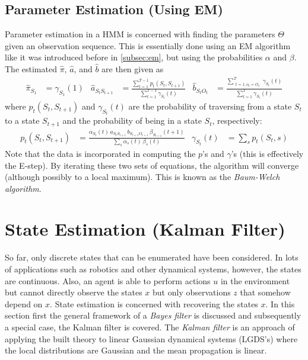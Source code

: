		\subsection{Parameter Estimation (Using EM)}
			Parameter estimation in a HMM is concerned with finding the parameters \(\Theta\) given an observation sequence. This is essentially done using an EM algorithm like it was introduced before in \autoref{subsec:em}, but using the probabilities \(\alpha\) and \(\beta\). The estimated \(\hat{\pi}\), \(\hat{a}\), and \(\hat{b}\) are then given as
			\begin{align}
				\hat{\pi}_{S_1}         & = \gamma_{S_1}(1)                                                                                 &
				\hat{a}_{S_t S_{t + 1}} & = \frac{\sum_{t = 1}^{T - 1} p_t(S_t, S_{t + 1})}{\sum_{t = 1}^{T - 1} \gamma_{S_t}(t)}           &
				\hat{b}_{S_t O_t}       & = \frac{\sum_{\substack{t = 1; o_t = O_t}}^{T} \gamma_{S_t}(t)}{\sum_{t = 1}^{T} \gamma_{S_t}(t)}
			\end{align}
			where \( p_t(S_t, S_{t + 1}) \) and \( \gamma_{S_t}(t) \) are the probability of traversing from a state \(S_t\) to a state \(S_{t + 1}\) and the probability of being in a state \(S_t\), respectively:
			\begin{align}
				p_t(S_t, S_{t + 1}) & = \frac{\alpha_{S_t}(t) \, a_{S_t S_{t + 1}} \, b_{S_{t + 1} O_{t + 1}} \, \beta_{S_{t + 1}}(t + 1)}{\sum_s \alpha_s(t) \, \beta_s(t)} &
				\gamma_{S_t}(t)     & = \sum_s p_t(S_t, s)
			\end{align}
			Note that the data is incorporated in computing the \(p\)'s and \(\gamma\)'s (this is effectively the E-step). By iterating these two sets of equations, the algorithm will converge (although possibly to a local maximum). This is known as the \emph{Baum-Welch algorithm}.

	\section{State Estimation (Kalman Filter)}
		So far, only discrete states that can be enumerated have been considered. In lots of applications such as robotics and other dynamical systems, however, the states are continuous. Also, an agent is able to perform actions \(u\) in the environment but cannot directly observe the states \(x\) but only observations \(z\) that somehow depend on \(x\). State estimation is concerned with recovering the states \(x\). In this section first the general framework of a \emph{Bayes filter} is discussed and subsequently a special case, the Kalman filter is covered. The \emph{Kalman filter} is an approach of applying the built theory to linear Gaussian dynamical systems (LGDS's) where the local distributions are Gaussian and the mean propagation is linear.

